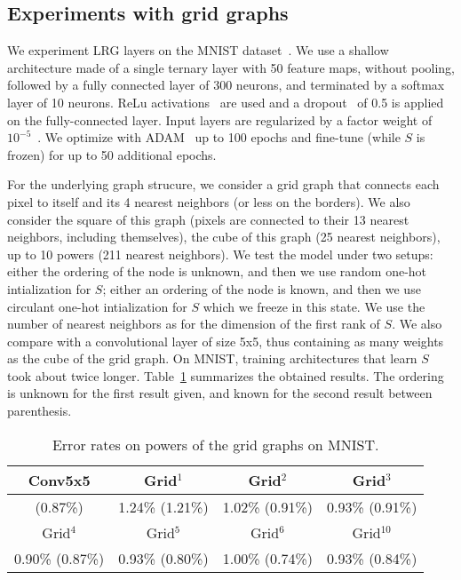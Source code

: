 \subsection{Experiments with grid graphs}

We experiment LRG layers on the MNIST dataset~\citep{lecun1998mnist}. We use a shallow architecture made of a single ternary layer with 50 feature maps, without pooling, followed by a fully connected layer of 300 neurons, and terminated by a softmax layer of 10 neurons. ReLu activations~\citep{glorot2011deep} are used and a dropout~\citep{srivastava2014dropout} of 0.5 is applied on the fully-connected layer. Input layers are regularized by a factor weight of $10^{-5}$~\citep{ng2004feature}. We optimize with ADAM~\citep{kingma2014adam} up to 100 epochs and fine-tune (while $S$ is frozen) for up to 50 additional epochs.

For the underlying graph strucure, we consider a grid graph that connects each pixel to itself and its 4 nearest neighbors (or less on the borders). We also consider the square of this graph (pixels are connected to their 13 nearest neighbors, including themselves), the cube of this graph (25 nearest neighbors), up to 10 powers (211 nearest neighbors).
We test the model under two setups: either the ordering of the node is unknown, and then we use random one-hot intialization for $S$; either an ordering of the node is known, and then we use circulant one-hot intialization for $S$ which we freeze in this state. We use the number of nearest neighbors as for the dimension of the first rank of $S$.
We also compare with a convolutional layer of size 5x5, thus containing as many weights as the cube of the grid graph. On MNIST, training architectures that learn $S$ took about twice longer. Table~\ref{toy} summarizes the obtained results. The ordering is unknown for the first result given, and known for the second result between parenthesis.

\begin{table}[H]
  \caption{Error rates on powers of the grid graphs on MNIST.}
  \begin{center}
    \bgroup
    \def\arraystretch{1.5}%
    \begin{tabular}{|c|c|c|c|}
      \hline
      Conv5x5 & Grid$^1$ & Grid$^2$ & Grid$^3$\\
      \hline
      (0.87\%) & 1.24\% (1.21\%) & 1.02\% (0.91\%) & 0.93\% (0.91\%)\\
      \hline
      \hline
      Grid$^4$ & Grid$^5$ & Grid$^6$ & Grid$^{10}$\\
      \hline
      0.90\% (0.87\%) & 0.93\% (0.80\%) & 1.00\% (0.74\%) & 0.93\% (0.84\%)\\
      \hline
    \end{tabular}
    \egroup
  \end{center}
  \label{toy}
\end{table}

